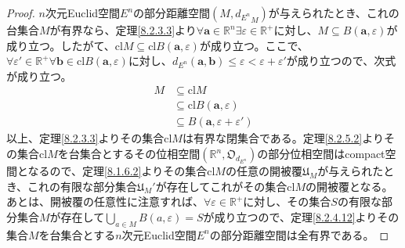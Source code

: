 \documentclass[dvipdfmx]{jsarticle}
\begin{document}
\begin{proof}
$n$次元Euclid空間$E^{n}$の部分距離空間$\left( M,{d_{E^{n}}}_{M} \right)$が与えられたとき、これの台集合$M$が有界なら、定理\ref{8.2.3.3}より$\forall\mathbf{a} \in \mathbb{R}^{n}\exists\varepsilon \in \mathbb{R}^{+}$に対し、$M \subseteq B\left( \mathbf{a},\varepsilon \right)$が成り立つ。したがて、${\mathrm{cl}}M \subseteq {\mathrm{cl}}{B\left( \mathbf{a},\varepsilon \right)}$が成り立つ。ここで、$\forall\varepsilon' \in \mathbb{R}^{+}\forall\mathbf{b} \in {\mathrm{cl}}{B\left( \mathbf{a},\varepsilon \right)}$に対し、$d_{E^{n}}\left( \mathbf{a},\mathbf{b} \right) \leq \varepsilon < \varepsilon + \varepsilon'$が成り立つので、次式が成り立つ。
\begin{align*}
M &\subseteq {\mathrm{cl}}M\\
&\subseteq {\mathrm{cl}}{B\left( \mathbf{a},\varepsilon \right)}\\
&\subseteq B\left( \mathbf{a},\varepsilon + \varepsilon' \right)
\end{align*}
以上、定理\ref{8.2.3.3}よりその集合${\mathrm{cl}}M$は有界な閉集合である。定理\ref{8.2.5.2}よりその集合${\mathrm{cl}}M$を台集合とするその位相空間$\left( \mathbb{R}^{n},\mathfrak{O}_{d_{E^{n}}} \right)$の部分位相空間はcompact空間となるので、定理\ref{8.1.6.2}よりその集合${\mathrm{cl}}M$の任意の開被覆$\mathfrak{U}_{M}$が与えられたとき、これの有限な部分集合$\mathfrak{U}_{M}'$が存在してこれがその集合${\mathrm{cl}}M$の開被覆となる。あとは、開被覆の任意性に注意すれば、$\forall\varepsilon \in \mathbb{R}^{+}$に対し、その集合$S$の有限な部分集合$M$が存在して$\bigcup_{a \in M} {B(a,\varepsilon)} = S$が成り立つので、定理\ref{8.2.4.12}よりその集合$M$を台集合とする$n$次元Euclid空間$E^{n}$の部分距離空間は全有界である。
\end{proof}
\end{document}
